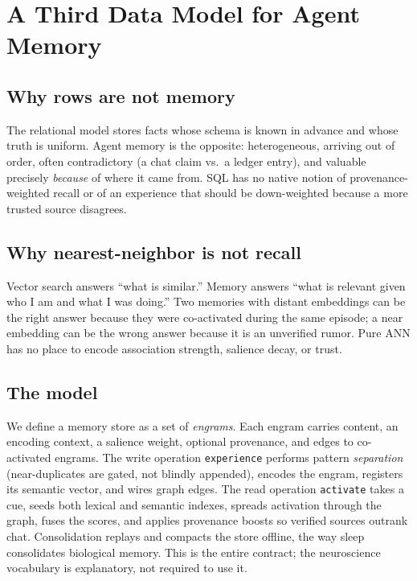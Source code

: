 \documentclass[11pt]{article}
\begin{document}
\section{A Third Data Model for Agent Memory}
\label{sec:model}
\subsection{Why rows are not memory}
The relational model stores facts whose schema is known in advance and whose
truth is uniform. Agent memory is the opposite: heterogeneous, arriving out of
order, often contradictory (a chat claim vs.\ a ledger entry), and valuable
precisely \emph{because} of where it came from. SQL has no native notion of
provenance-weighted recall or of an experience that should be down-weighted
because a more trusted source disagrees.

\subsection{Why nearest-neighbor is not recall}
Vector search answers ``what is similar.'' Memory answers ``what is relevant given
who I am and what I was doing.'' Two memories with distant embeddings can be the
right answer because they were co-activated during the same episode; a near
embedding can be the wrong answer because it is an unverified rumor. Pure ANN has
no place to encode association strength, salience decay, or trust.

\subsection{The model}
We define a memory store as a set of \emph{engrams}. Each engram carries content,
an encoding context, a salience weight, optional provenance, and edges to
co-activated engrams. The write operation \texttt{experience} performs pattern
\emph{separation} (near-duplicates are gated, not blindly appended), encodes the
engram, registers its semantic vector, and wires graph edges. The read operation
\texttt{activate} takes a cue, seeds both lexical and semantic indexes, spreads
activation through the graph, fuses the scores, and applies provenance boosts so
verified sources outrank chat. Consolidation replays and compacts the store
offline, the way sleep consolidates biological memory. This is the entire
contract; the neuroscience vocabulary is explanatory, not required to use it.
\end{document}
